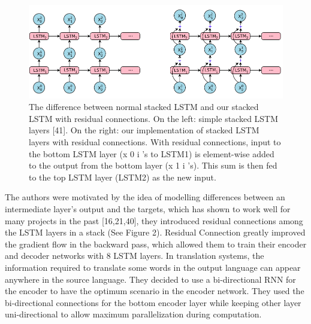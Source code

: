 \begin{figure}
\includegraphics[width=\textwidth]{figures/gnmt2.png}
\caption{The difference between normal stacked LSTM and our stacked LSTM with residual connections.
On the left: simple stacked LSTM layers [41]. On the right: our implementation of stacked LSTM layers
with residual connections. With residual connections, input to the bottom LSTM layer (x
0
i
’s to LSTM1) is
element-wise added to the output from the bottom layer (x
1
i
’s). This sum is then fed to the top LSTM layer
(LSTM2) as the new input.} \label{fig1}
\end{figure}

The authors were motivated by the idea of modelling differences between an intermediate layer’s output and the targets, which has shown to work well for many projects in the past [16,21,40], they introduced residual connections among the LSTM layers in a stack (See Figure 2). Residual Connection greatly improved the gradient flow in the backward pass, which allowed them to train their encoder and decoder networks with 8 LSTM layers. In translation systems, the information required to translate some words in the output language can appear anywhere in the source language. They decided to use a bi-directional RNN for the encoder to have the optimum scenario in the encoder network. They used the bi-directional connections for the bottom encoder layer while keeping other layer uni-directional to allow maximum parallelization during computation. 

